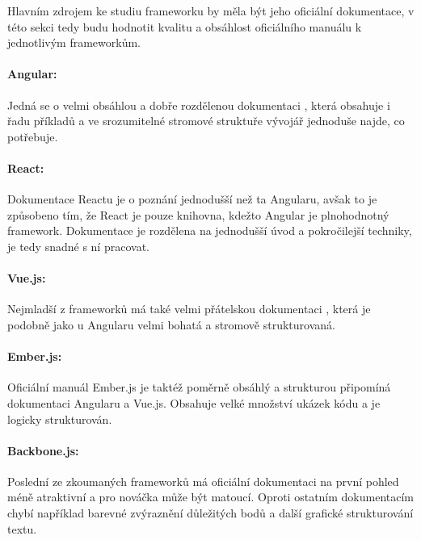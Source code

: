Hlavním zdrojem ke studiu frameworku by měla být jeho oficiální dokumentace, v této sekci tedy budu hodnotit kvalitu a obsáhlost oficiálního manuálu k jednotlivým frameworkům.

\paragraph{Angular:} Jedná se o velmi obsáhlou a dobře rozdělenou dokumentaci \cite{angular-doc}, která obsahuje i řadu příkladů a ve srozumitelné stromové struktuře vývojář jednoduše najde, co potřebuje.

\paragraph{React:} Dokumentace Reactu \cite{react-doc} je o poznání jednodušší než ta Angularu, avšak to je způsobeno tím, že React je pouze knihovna, kdežto Angular je plnohodnotný framework. Dokumentace je rozdělena na jednodušší úvod a pokročilejší techniky, je tedy snadné s ní pracovat.

\paragraph{Vue.js:} Nejmladší z frameworků má také velmi přátelskou dokumentaci \cite{vue-doc}, která je podobně jako u Angularu velmi bohatá a stromově strukturovaná.

\paragraph{Ember.js:} Oficiální manuál Ember.js \cite{ember-doc} je taktéž poměrně obsáhlý a strukturou připomíná dokumentaci Angularu a Vue.js. Obsahuje velké množství ukázek kódu a je logicky strukturován.

\paragraph{Backbone.js:} Poslední ze zkoumaných frameworků má oficiální dokumentaci \cite{backbone-doc} na první pohled méně atraktivní a pro nováčka může být matoucí. Oproti ostatním dokumentacím chybí například barevné zvýraznění důležitých bodů a další grafické strukturování textu.

